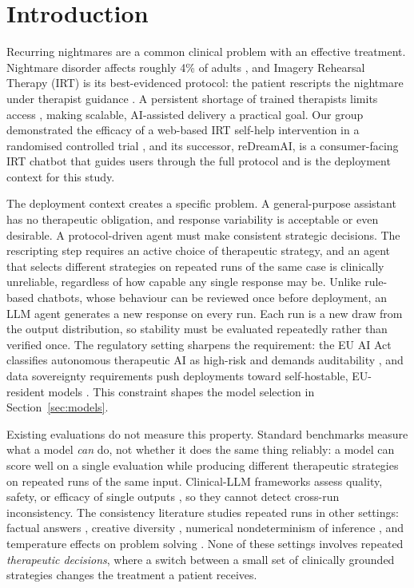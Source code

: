 \section{Introduction}
\label{sec:intro}

Recurring nightmares are a common clinical problem with an effective treatment. Nightmare disorder affects roughly 4\% of adults \citep{sandman2013nightmares, li2010prevalence}, and Imagery Rehearsal Therapy (IRT) is its best-evidenced protocol: the patient rescripts the nightmare under therapist guidance \citep{krakow2001imagery, morgenthaler2018position}. A persistent shortage of trained therapists limits access \citep{stade2024large}, making scalable, AI-assisted delivery a practical goal. Our group demonstrated the efficacy of a web-based IRT self-help intervention in a randomised controlled trial \citep{voss2026efficacy}, and its successor, reDreamAI, is a consumer-facing IRT chatbot that guides users through the full protocol and is the deployment context for this study.

The deployment context creates a specific problem. A general-purpose assistant has no therapeutic obligation, and response variability is acceptable or even desirable. A protocol-driven agent must make consistent strategic decisions. The rescripting step requires an active choice of therapeutic strategy, and an agent that selects different strategies on repeated runs of the same case is clinically unreliable, regardless of how capable any single response may be. Unlike rule-based chatbots, whose behaviour can be reviewed once before deployment, an LLM agent generates a new response on every run. Each run is a new draw from the output distribution, so stability must be evaluated repeatedly rather than verified once. The regulatory setting sharpens the requirement: the EU AI Act classifies autonomous therapeutic AI as high-risk and demands auditability \citep{vankolfschooten2024artificial, aboy2024navigating}, and data sovereignty requirements push deployments toward self-hostable, EU-resident models \citep{dale2025sovereign}. This constraint shapes the model selection in Section~\ref{sec:models}.

Existing evaluations do not measure this property. Standard benchmarks measure what a model \emph{can} do, not whether it does the same thing reliably: a model can score well on a single evaluation while producing different therapeutic strategies on repeated runs of the same input. Clinical-LLM frameworks assess quality, safety, or efficacy of single outputs \citep{zhang2024psyeval, chiu2024computational}, so they cannot detect cross-run inconsistency. The consistency literature studies repeated runs in other settings: factual answers \citep{novikova2025consistency}, creative diversity \citep{xu2025echoes}, numerical nondeterminism of inference \citep{yuan2025understanding}, and temperature effects on problem solving \citep{renze2024effect}. None of these settings involves repeated \emph{therapeutic decisions}, where a switch between a small set of clinically grounded strategies changes the treatment a patient receives.

